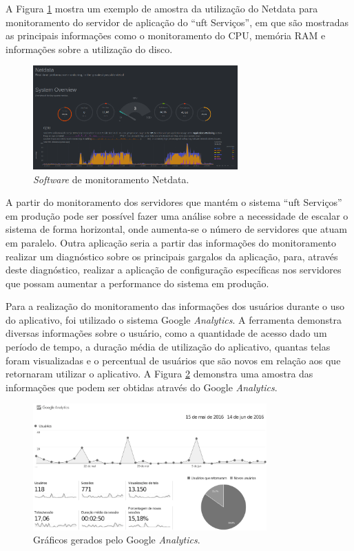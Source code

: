 A Figura \ref{netdata} mostra um exemplo de amostra da utilização do Netdata para monitoramento do servidor de aplicação do ``\acrshort{uft} Serviços'', em que são mostradas as principais informações como o monitoramento do CPU, memória RAM e informações sobre a utilização do disco.

\begin{figure}[H]
  \centering
  \small
  \includegraphics[width=0.7\textwidth]{figuras/netdata.png} 
  \caption{\textit{Software} de monitoramento Netdata.}
  \label{netdata} 
\end{figure}

A partir do monitoramento dos servidores que mantém o sistema ``\acrshort{uft} Serviços'' em produção pode ser possível fazer uma análise sobre a necessidade de escalar o sistema de forma horizontal, onde aumenta-se o número de servidores que atuam em paralelo. Outra aplicação seria a partir das informações do monitoramento realizar um diagnóstico sobre os principais gargalos da aplicação, para, através deste diagnóstico, realizar a aplicação de configuração específicas nos servidores que possam aumentar a performance do sistema em produção.

Para a realização do monitoramento das informações dos usuários durante o uso do aplicativo, foi utilizado o sistema Google \textit{Analytics}. A ferramenta demonstra diversas informações sobre o usuário, como a quantidade de acesso dado um período de tempo, a duração média de utilização do aplicativo, quantas telas foram visualizadas e o percentual de usuários que são novos em relação aos que retornaram utilizar o aplicativo. A Figura \ref{google_analytics} demonstra uma amostra das informações que podem ser obtidas através do Google \textit{Analytics}.

\begin{figure}[H]
  \centering
  \small
  \includegraphics[width=0.8\textwidth]{figuras/analytics_acesso.eps} 
  \caption{Gráficos gerados pelo Google \textit{Analytics}.}
  \label{google_analytics}
\end{figure}

